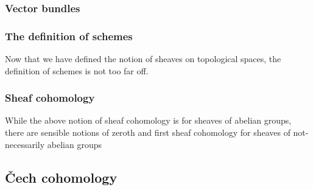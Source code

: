 

\subsubsection{Vector bundles}


\subsubsection{The definition of schemes}

Now that we have defined the notion of sheaves on topological spaces, the definition of schemes is not too far off.









\subsubsection{Sheaf cohomology}






While the above notion of sheaf cohomology is for sheaves of abelian groups, there are sensible notions of zeroth and first sheaf cohomology for sheaves of not-necessarily abelian groups






\subsection{\v{C}ech cohomology}

